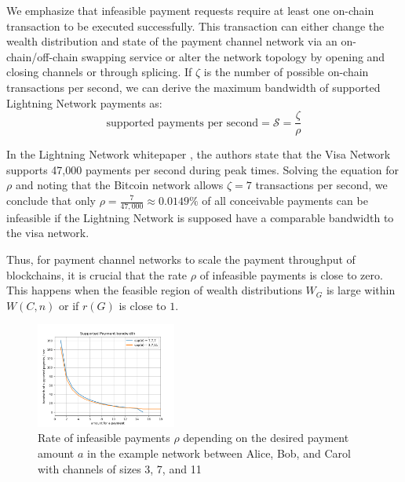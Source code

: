\documentclass[10pt,twocolumn]{article}
\begin{document}


We emphasize that infeasible payment requests require at least one on-chain transaction to be executed successfully.  
This transaction can either change the wealth distribution and state of the payment channel network via an on-chain/off-chain swapping service or alter the network topology by opening and closing channels or through splicing.  
If \( \zeta \) is the number of possible on-chain transactions per second, we can derive the maximum bandwidth of supported Lightning Network payments as:  
\begin{equation}
\text{supported payments per second} = \mathcal{S} = \frac{\zeta}{\rho}
\end{equation}

In the Lightning Network whitepaper \cite{poon2016bitcoin}, the authors state that the Visa Network supports 47,000 payments per second during peak times.  
Solving the equation for \( \rho \) and noting that the Bitcoin network allows \( \zeta = 7 \) transactions per second, we conclude that only \( \rho = \frac{7}{47,000} \approx 0.0149\% \) of all conceivable payments can be infeasible if the Lightning Network is supposed have a comparable bandwidth to the visa network.  

Thus, for payment channel networks to scale the payment throughput of blockchains, it is crucial that the rate \( \rho \) of infeasible payments is close to zero.  
This happens when the feasible region of wealth distributions \( W_G \) is large within \( W(C,n) \) or if \( r(G) \) is close to $1$.  

\begin{figure}[h]
\centering
 \includegraphics[width=0.41\textwidth]{paymentrate}
\caption{Rate of infeasible payments \( \rho \) depending on the desired payment amount \( a \) in the example network between Alice, Bob, and Carol with channels of sizes 3, 7, and 11}
\label{fig:bandwidth}
\end{figure}
\end{document}
